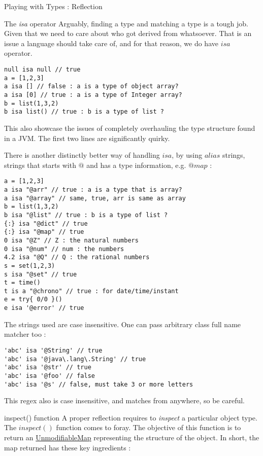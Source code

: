 \begin{section}{Playing with Types : Reflection}
\begin{subsection}{The \emph{isa} operator}
Arguably, finding a type and matching a type is a tough job.
Given that we need to care about who got derived from whatsoever.
That is an issue a language should take care of, and for that reason, 
we do have $isa$ operator.

\begin{lstlisting}[style=JexlStyle]
null isa null // true 
a = [1,2,3] 
a isa [] // false : a is a type of object array?
a isa [0] // true : a is a type of Integer array?
b = list(1,3,2)
b isa list() // true : b is a type of list ? 
\end{lstlisting}
This also showcase the issues of completely overhauling the type 
structure found in a JVM. The first two lines are significantly quirky.

There is another distinctly better way of handling $isa$, by using $alias$ strings,
strings that starts with $@$ and has a type information, e.g. $@map$ :
 
\begin{lstlisting}[style=JexlStyle]
a = [1,2,3] 
a isa "@arr" // true : a is a type that is array?
a isa "@array" // same, true, arr is same as array
b = list(1,3,2)
b isa "@list" // true : b is a type of list ?
{:} isa "@dict" // true 
{:} isa "@map" // true 
0 isa "@Z" // Z : the natural numbers 
0 isa "@num" // num : the numbers 
4.2 isa "@Q" // Q : the rational numbers
s = set(1,2,3)
s isa "@set" // true  
t = time() 
t is a "@chrono" // true : for date/time/instant
e = try{ 0/0 }()
e isa '@error' // true 
\end{lstlisting}
The strings used are case insensitive.
One can pass arbitrary class full name matcher too :
\begin{lstlisting}[style=JexlStyle]
'abc' isa '@String' // true 
'abc' isa '@java\.lang\.String' // true 
'abc' isa '@str' // true 
'abc' isa '@foo' // false 
'abc' isa '@s' // false, must take 3 or more letters
\end{lstlisting}
This regex also is case insensitive, and matches from anywhere, 
so be careful. 
\end{subsection}



\begin{subsection}{inspect() function}
A proper reflection requires to \emph{inspect} a particular object type.
The $inspect()$ function comes to foray. The objective of this function 
is to return an \href{https://docs.oracle.com/javase/8/docs/api/java/util/Collections.html#unmodifiableMap-java.util.Map-}{UnmodifiableMap} 
representing the structure of the object. In short, the map returned has these key ingredients :


\end{subsection}
\end{section}
